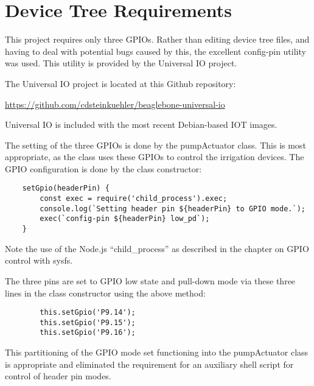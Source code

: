 %
%
%

\chapter{Device Tree Requirements}

This project requires only three GPIOs.  Rather than editing device tree files, 
and having to deal with potential bugs caused by this, the excellent config-pin 
utility was used.  This utility is provided by the Universal IO project.

The Universal IO project is located at this Github repository:

\url{https://github.com/cdsteinkuehler/beaglebone-universal-io}

Universal IO is included with the most recent Debian-based IOT images.

The setting of the three GPIOs is done by the pumpActuator class.  This is most 
appropriate, as the class uses these GPIOs to control the irrigation devices.  
The GPIO configuration is done by the class constructor:

\begin{verbatim}
    setGpio(headerPin) {
        const exec = require('child_process').exec;
        console.log(`Setting header pin ${headerPin} to GPIO mode.`);
        exec(`config-pin ${headerPin} low_pd`);
    }
\end{verbatim}

Note the use of the Node.js ``child\_process'' as described in the chapter on 
GPIO control with sysfs.

The three pins are set to GPIO low state and pull-down mode via these three 
lines in the class constructor using the above method:

\begin{verbatim}
        this.setGpio('P9.14');
        this.setGpio('P9.15');
        this.setGpio('P9.16');
\end{verbatim}

This partitioning of the GPIO mode set functioning into the pumpActuator class 
is appropriate and eliminated the requirement for an auxiliary shell script for 
control of header pin modes.




